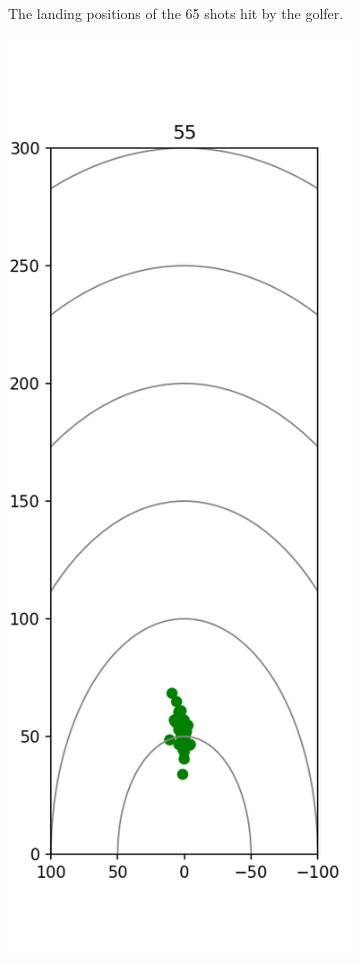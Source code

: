 \documentclass{kththesis}
\begin{document}
\begin{figure}
\begin{subfigure}{0.4\textwidth}
    \caption{The landing positions of the 65 shots hit by the golfer.}
    \label{fig:65_shots}
    \end{subfigure}
    \begin{subfigure}{0.4\textwidth}
    \centering
    \includegraphics[height=0.4\textheight]{Shots/55_shots.png} 

\end{subfigure}
\end{figure}
\end{document}
